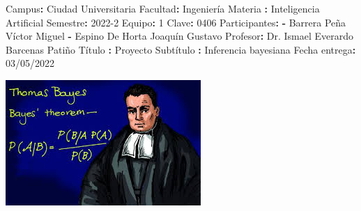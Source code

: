 \documentclass[
  spanish,
  ignorenonframetext,
]{beamer}
\author{}
\date{}
\newenvironment{Shaded}{}{}
\newcommand{\AttributeTok}[1]{\textcolor[rgb]{0.49,0.56,0.16}{#1}}
\newcommand{\DecValTok}[1]{\textcolor[rgb]{0.25,0.63,0.44}{#1}}
\newcommand{\FunctionTok}[1]{\textcolor[rgb]{0.02,0.16,0.49}{#1}}
\newcommand{\KeywordTok}[1]{\textcolor[rgb]{0.00,0.44,0.13}{\textbf{#1}}}
\begin{document}
\begin{frame}[fragile]
\begin{Shaded}
\begin{Highlighting}[]
\FunctionTok{Campus}\KeywordTok{:}\AttributeTok{ Ciudad Universitaria}
\FunctionTok{Facultad}\KeywordTok{:}\AttributeTok{ Ingeniería}
\FunctionTok{Materia }\KeywordTok{:}\AttributeTok{ Inteligencia Artificial}
\FunctionTok{Semestre}\KeywordTok{:}\AttributeTok{ 2022{-}2}
\FunctionTok{Equipo}\KeywordTok{:}\AttributeTok{ }\DecValTok{1}
\FunctionTok{Clave}\KeywordTok{:}\AttributeTok{ }\DecValTok{0406}
\FunctionTok{Participantes}\KeywordTok{:}\AttributeTok{ }
\KeywordTok{{-}}\AttributeTok{ Barrera Peña Víctor Miguel}
\KeywordTok{{-}}\AttributeTok{ Espino De Horta Joaquín Gustavo}
\AttributeTok{    }
\FunctionTok{Profesor}\KeywordTok{:}\AttributeTok{ Dr. Ismael Everardo Barcenas Patiño}
\FunctionTok{Título }\KeywordTok{:}\AttributeTok{ Proyecto }
\FunctionTok{Subtítulo }\KeywordTok{:}\AttributeTok{ Inferencia bayesiana}
\FunctionTok{Fecha entrega}\KeywordTok{:}\AttributeTok{ 03/05/2022}
\end{Highlighting}
\end{Shaded}
\end{frame}

\begin{frame}{\includegraphics{img/README/portada.jpg}}
\protect\hypertarget{portada}{}
\pagebreak
\end{frame}
\end{document}
